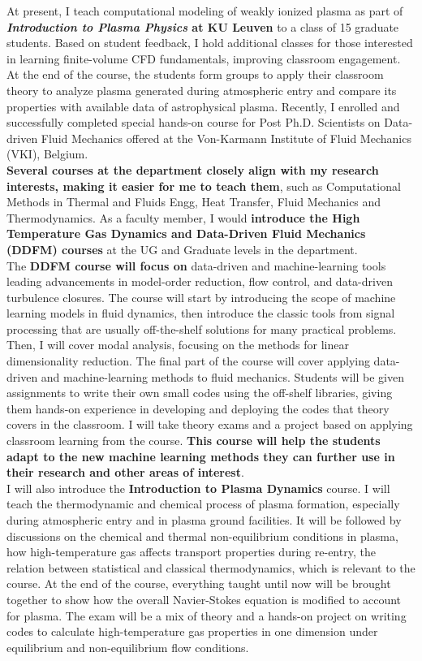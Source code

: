 \documentclass[11pt,a4paper,times]{moderncv} %
\begin{document}
At present, I teach computational modeling of weakly ionized plasma as part of \textbf{\textit{Introduction to Plasma Physics} at KU Leuven} to a class of 15 graduate students. Based on student feedback, I hold additional classes for those interested in learning finite-volume CFD fundamentals, improving classroom engagement. At the end of the course, the students form groups to apply their classroom theory to analyze plasma generated during atmospheric entry and compare its properties with available data of astrophysical plasma. Recently, I enrolled and successfully completed special hands-on course for Post Ph.D. Scientists on Data-driven Fluid Mechanics offered at the Von-Karmann Institute of Fluid Mechanics (VKI), Belgium.\\
\textbf{Several courses at the department closely align with my research interests, making it easier for me to teach them}, such as Computational Methods in Thermal and Fluids Engg, Heat Transfer, Fluid Mechanics and Thermodynamics. 
As a faculty member, I would \textbf{introduce the High Temperature Gas Dynamics and Data-Driven Fluid Mechanics (DDFM) courses} at the UG and Graduate levels in the department.\\
The \textbf{DDFM course will focus on} data-driven and machine-learning tools leading advancements in model-order reduction, flow control, and data-driven turbulence closures. The course will start by introducing the scope of machine learning models in fluid dynamics, then introduce the classic tools from signal processing that are usually off-the-shelf solutions for many practical problems. Then, I will cover modal analysis, focusing on the methods for linear dimensionality reduction. The final part of the course will cover applying data-driven and machine-learning methods to fluid mechanics. Students will be given assignments to write their own small codes using the off-shelf libraries, giving them hands-on experience in developing and deploying the codes that theory covers in the classroom. I will take theory exams and a project based on applying classroom learning from the course. \textbf{This course will help the students adapt to the new machine learning methods they can further use in their research and other areas of interest}.\\
I will also introduce the \textbf{Introduction to Plasma Dynamics} course. I will teach the thermodynamic and chemical process of plasma formation, especially during atmospheric entry and in plasma ground facilities. It will be followed by discussions on the chemical and thermal non-equilibrium conditions in plasma, how high-temperature gas affects transport properties during re-entry, the relation between statistical and classical thermodynamics, which is relevant to the course. At the end of the course, everything taught until now will be brought together to show how the overall Navier-Stokes equation is modified to account for plasma. The exam will be a mix of theory and a hands-on project on writing codes to calculate high-temperature gas properties in one dimension under equilibrium and non-equilibrium flow conditions.
\end{document}
